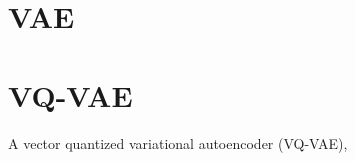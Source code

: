 \documentclass[../../thesis.tex]{subfiles}
\begin{document}
\section*{VAE}



\section*{VQ-VAE}

A vector quantized variational autoencoder (VQ-VAE), 
\end{document}
